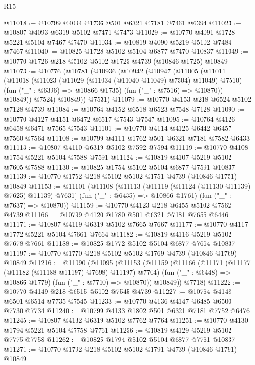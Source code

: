 \begin{lexlean}{R15}
\begin{coremodule}
{{{{{{{{{{{@11018 := @10799 @4094 @1736 @501 @6321 @7181 @7461 @6394
@11023 := @10807 @4093 @6319 @5102 @7471 @7473
@11029 := @10770 @4091 @1728 @5221 @5104 @7467 @7470
@11034 := @10819 @4090 @5219 @5102 @7484 @7467
@11040 := @10825 @1728 @5102 @5104 @6877 @7470 @10837
@11049 := @10770 @1726 @218 @5102 @5102 @1725 @4739 (@10846 @1725) @10849
@11073 := @10776
    (@10781
      (@10936
        (@10942
          (@10947
            (@11005
              (@11011
                (@11018
                  (@11023 (@11029 (@11034 (@11040 @11049) @7504) @11049) @7510)
                  (fun ("_" : @6396) => @10866 @1735)
                  (fun ("_" : @7516) => @10870))
                @10849))
            @7524)
          @10849))
      @7531)
@11079 := @10770 @4153 @218 @6524 @5102 @7128 @4739
@11084 := @10764 @4152 @6518 @6523 @7548 @7128
@11090 := @10770 @4127 @4151 @6472 @6517 @7543 @7547
@11095 := @10764 @4126 @6458 @6471 @7565 @7543
@11101 := @10770 @4114 @4125 @6442 @6457 @7560 @7564
@11108 := @10799 @4111 @1762 @501 @6321 @7181 @7582 @6433
@11113 := @10807 @4110 @6319 @5102 @7592 @7594
@11119 := @10770 @4108 @1754 @5221 @5104 @7588 @7591
@11124 := @10819 @4107 @5219 @5102 @7605 @7588
@11130 := @10825 @1754 @5102 @5104 @6877 @7591 @10837
@11139 := @10770 @1752 @218 @5102 @5102 @1751 @4739 (@10846 @1751) @10849
@11153 := @11101
    (@11108
      (@11113 (@11119 (@11124 (@11130 @11139) @7625) @11139) @7631)
      (fun ("_" : @6435) => @10866 @1761)
      (fun ("_" : @7637) => @10870))
@11159 := @10770 @4123 @218 @6455 @5102 @7562 @4739
@11166 := @10799 @4120 @1780 @501 @6321 @7181 @7655 @6446
@11171 := @10807 @4119 @6319 @5102 @7665 @7667
@11177 := @10770 @4117 @1772 @5221 @5104 @7661 @7664
@11182 := @10819 @4116 @5219 @5102 @7678 @7661
@11188 := @10825 @1772 @5102 @5104 @6877 @7664 @10837
@11197 := @10770 @1770 @218 @5102 @5102 @1769 @4739 (@10846 @1769) @10849
@11216 := @11090
    (@11095
      (@11153
        (@11159
          (@11166
            (@11171 (@11177 (@11182 (@11188 @11197) @7698) @11197) @7704)
            (fun ("_" : @6448) => @10866 @1779)
            (fun ("_" : @7710) => @10870))
          @10849))
      @7718)
@11222 := @10770 @4149 @218 @6515 @5102 @7545 @4739
@11227 := @10764 @4148 @6501 @6514 @7735 @7545
@11233 := @10770 @4136 @4147 @6485 @6500 @7730 @7734
@11240 := @10799 @4133 @1802 @501 @6321 @7181 @7752 @6476
@11245 := @10807 @4132 @6319 @5102 @7762 @7764
@11251 := @10770 @4130 @1794 @5221 @5104 @7758 @7761
@11256 := @10819 @4129 @5219 @5102 @7775 @7758
@11262 := @10825 @1794 @5102 @5104 @6877 @7761 @10837
@11271 := @10770 @1792 @218 @5102 @5102 @1791 @4739 (@10846 @1791) @10849
}}}}}}}}}}}
\end{coremodule}
\end{lexlean}
